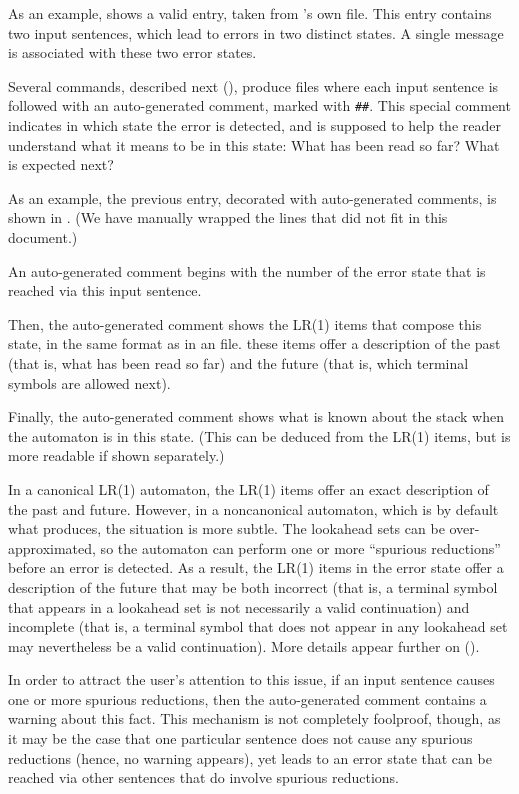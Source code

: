 \documentclass[onecolumn,11pt,nocopyrightspace,preprint]{sigplanconf}
\begin{document}
As an example,  shows a valid entry, taken
from \menhir's own \messages file. This entry contains two input sentences,
which lead to errors in two distinct states. A single message is associated
with these two error states.

Several commands, described next (),
produce \messages files where each input sentence is followed with an
auto-generated comment, marked with \verb+##+. This special comment indicates
in which state the error is detected, and is supposed to help the reader
understand what it means to be in this state: What has been read so far? What
is expected next?

As an example, the previous entry, decorated with auto-generated comments, is
shown in . (We have manually wrapped the
lines that did not fit in this document.)

An auto-generated comment begins with the number of the error state that is
reached via this input sentence.

Then, the auto-generated comment shows the LR(1) items that compose this
state, in the same format as in an \automaton file. these items offer a
description of the past (that is, what has been read so far) and the future
(that is, which terminal symbols are allowed next).

Finally, the auto-generated comment shows what is known about the stack when
the automaton is in this state. (This can be deduced from the LR(1) items, but
is more readable if shown separately.)

In a canonical LR(1) automaton, the LR(1) items offer an exact description of
the past and future. However, in a noncanonical automaton, which is by default
what \menhir produces, the situation is more subtle. The lookahead sets can be
over-approximated, so the automaton can perform one or more ``spurious
reductions'' before an error is detected. As a result, the LR(1) items in the
error state offer a description of the future that may be both incorrect (that
is, a terminal symbol that appears in a lookahead set is not necessarily a
valid continuation) and incomplete (that is, a terminal symbol that does not
appear in any lookahead set may nevertheless be a valid continuation). More
details appear further on ().

In order to attract the user's attention to this issue, if an input sentence
causes one or more spurious reductions, then the auto-generated comment
contains a warning about this fact. This mechanism is not completely
foolproof, though, as it may be the case that one particular sentence does not
cause any spurious reductions (hence, no warning appears), yet leads to an
error state that can be reached via other sentences that do involve spurious
reductions.
\end{document}
